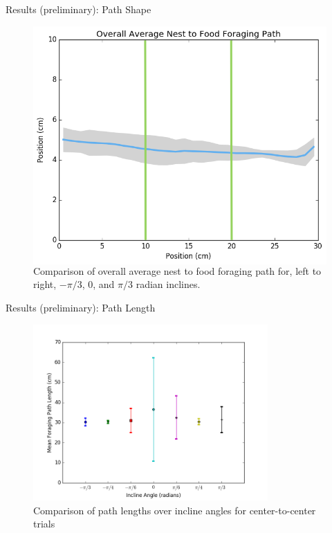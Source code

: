 \begin{frame}{Results (preliminary): Path Shape}
\begin{figure}
\begin{columns}[T,onlytextwidth]
\includegraphics[width=\textwidth]{results/center-to-center-average_path_pidiv3.png}
\end{columns}
\caption{Comparison of overall average nest to food foraging path for, left to right, $-\pi/3$, $0$, and $\pi/3$ radian inclines.}
\end{figure}
\end{frame}

\begin{frame}{Results (preliminary): Path Length}
\begin{figure}
\includegraphics[width=0.8\textwidth]{results/center-to-centermeanforagingpathlength.png}
\caption{Comparison of path lengths over incline angles for center-to-center trials}
\end{figure}
\end{frame}

